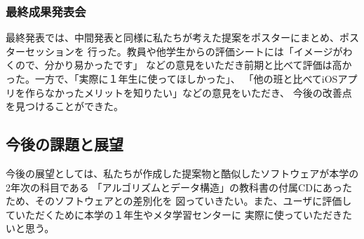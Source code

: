 \documentclass[twocolumn,draft]{jsarticle}
\begin{document}
\subsubsection{最終成果発表会}
\begin{hissu}
最終発表では、中間発表と同様に私たちが考えた提案をポスターにまとめ、ポスターセッションを
行った。教員や他学生からの評価シートには「イメージがわくので、分かり易かったです」
などの意見をいただき前期と比べて評価は高かった。一方で、「実際に１年生に使ってほしかった」、
「他の班と比べてiOSアプリを作らなかったメリットを知りたい」などの意見をいただき、
今後の改善点を見つけることができた。

\end{hissu}

\subsection{今後の課題と展望}
\begin{hissu}
今後の展望としては、私たちが作成した提案物と酷似したソフトウェアが本学の2年次の科目である
「アルゴリズムとデータ構造」の教科書の付属CDにあったため、そのソフトウェアとの差別化を
図っていきたい。また、ユーザに評価していただくために本学の１年生やメタ学習センターに
実際に使っていただきたいと思う。

\end{hissu}
\end{document}
